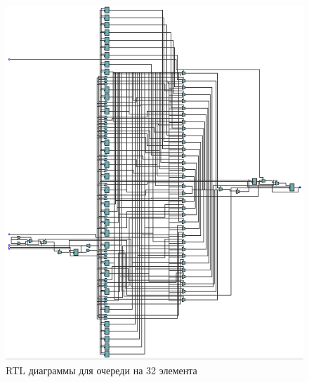 \documentclass[a4paper,14pt]{article}
\begin{document}
		\begin{figure}[H]
			\centering
			\includegraphics[width=0.8\linewidth]{images/z6_rtl_32_v1}
			\caption{RTL диаграммы для очереди на 32 элемента}
			\label{fig:z6_rtl_32_v1}
		\end{figure}
		
\end{document}
